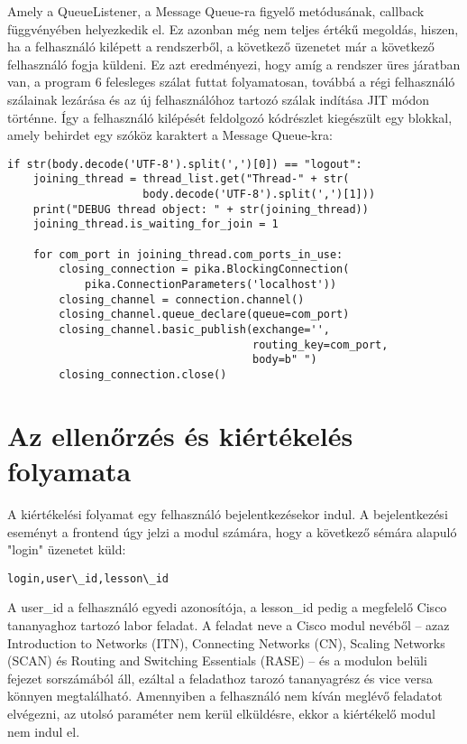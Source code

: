\documentclass[12pt]{report}
\begin{document}
Amely a QueueListener, a Message Queue-ra figyelő metódusának, callback függvényében helyezkedik el. Ez azonban még nem teljes értékű megoldás, hiszen, ha a felhasználó kilépett a rendszerből, a következő üzenetet már a következő felhasználó fogja küldeni. Ez azt eredményezi, hogy amíg a rendszer üres járatban van, a program 6 felesleges szálat futtat folyamatosan, továbbá a régi felhasználó szálainak lezárása és az új felhasználóhoz tartozó szálak indítása JIT módon történne. Így a felhasználó kilépését feldolgozó kódrészlet kiegészült egy blokkal, amely behirdet egy szóköz karaktert a Message Queue-kra:

\begin{verbatim}
if str(body.decode('UTF-8').split(',')[0]) == "logout":
    joining_thread = thread_list.get("Thread-" + str(
                     body.decode('UTF-8').split(',')[1]))
    print("DEBUG thread object: " + str(joining_thread))
    joining_thread.is_waiting_for_join = 1

    for com_port in joining_thread.com_ports_in_use:
        closing_connection = pika.BlockingConnection(
            pika.ConnectionParameters('localhost'))
        closing_channel = connection.channel()
        closing_channel.queue_declare(queue=com_port)
        closing_channel.basic_publish(exchange='',
                                      routing_key=com_port,
                                      body=b" ")
        closing_connection.close()
\end{verbatim}

\section{Az ellenőrzés és kiértékelés folyamata}


A kiértékelési folyamat egy felhasználó bejelentkezésekor indul. A bejelentkezési eseményt a frontend úgy jelzi a modul számára, hogy a következő sémára alapuló "login" üzenetet küld:

\begin{verbatim}
login,user\_id,lesson\_id
\end{verbatim}

A user\_id a felhasználó egyedi azonosítója, a lesson\_id pedig a megfelelő Cisco tananyaghoz tartozó labor feladat. A feladat neve a Cisco modul nevéből -- azaz Introduction to Networks (ITN), Connecting Networks (CN), Scaling Networks (SCAN) és Routing and Switching Essentials (RASE) -- és a modulon belüli fejezet sorszámából áll, ezáltal a feladathoz tarozó tananyagrész és vice versa könnyen megtalálható.
Amennyiben a felhasználó nem kíván meglévő feladatot elvégezni, az utolsó paraméter nem kerül elküldésre, ekkor a kiértékelő modul nem indul el.
\end{document}
